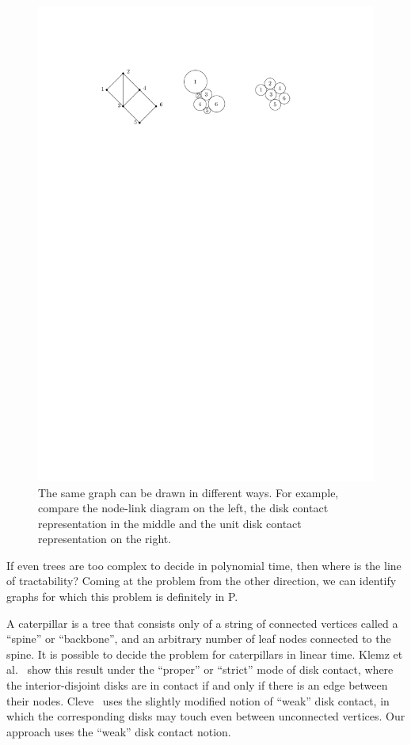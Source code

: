 \begin{figure}
    \centering
    \includegraphics{graphics/ch1_introduction.pdf}
    \caption[Drawing comparison]{The same graph can be drawn in different ways. For example, compare the node-link diagram on the left, the disk contact representation in the middle and the unit disk contact representation on the right.}
    \label{fig:ch1_introduction}
\end{figure}

If even trees are too complex to decide in polynomial time, then where is the line of tractability? Coming at the problem from the other direction, we can identify graphs for which this problem is definitely in P.

A caterpillar is a tree that consists only of a string of connected vertices called a ``spine'' or ``backbone'', and an arbitrary number of leaf nodes connected to the spine.
It is possible to decide the problem for caterpillars in linear time. Klemz et al.~\cite{Klemz2015} show this result under the ``proper'' or ``strict'' mode of disk contact, where the interior-disjoint disks are in contact if and only if there is an edge between their nodes. Cleve~\cite{Cleve2020} uses the slightly modified notion of ``weak'' disk contact, in which the corresponding disks may touch even between unconnected vertices. Our approach uses the ``weak'' disk contact notion.

